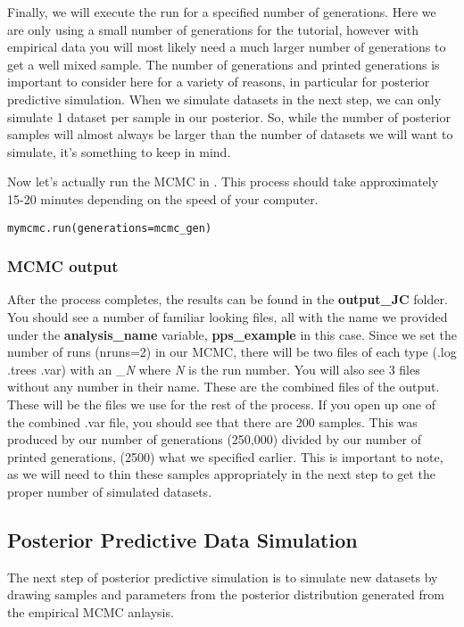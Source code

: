 Finally, we will execute the run for a specified number of generations. Here we are only using a small
number of generations for the tutorial, however with empirical data you will most likely need a much
larger number of generations to get a well mixed sample. The number of generations and printed generations
is important to consider here for a variety of reasons, in particular for posterior predictive simulation.
When we simulate datasets in the next step, we can only simulate 1 dataset per sample in our posterior. So,
while the number of posterior samples will almost always be larger than the number of datasets we will want
to simulate, it's something to keep in mind.


Now let's actually run the MCMC in \RevBayes. 
This process should take approximately 15-20 minutes depending on the speed of your computer.

{\tt \begin{Snugshade}[184,207,236]
\begin{lstlisting}
mymcmc.run(generations=mcmc_gen)
\end{lstlisting}
\end{Snugshade}}

\subsubsection{MCMC output}

After the process completes, the results can be found in the \textbf{output\_JC} folder. You should see a 
number of familiar looking files, all with the name we provided under the \textbf{analysis\_name} variable, 
\textbf{pps\_example} in this case. Since we set the number of runs (nruns=2) in our MCMC, there will be two files 
of each type (.log .trees .var) with an \_\textit{N} where \textit{N} is the run number. You will also see 3 files without 
any number in their name. These are the combined files of the output. These will be the files we use for 
the rest of the process. If you open up one of the combined .var file, you should see that there are 200 
samples. This was produced by our number of generations (250,000) divided by our number of printed generations,
(2500) what we specified earlier. This is important to note, as we will need to thin these samples 
appropriately in the next step to get the proper number of simulated datasets. 


\subsection{Posterior Predictive Data Simulation}
The next step of posterior predictive simulation is to simulate new datasets by drawing samples and 
parameters from the posterior distribution generated from the empirical MCMC anlaysis. 

